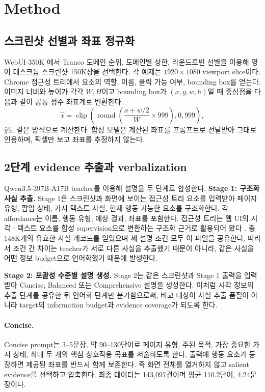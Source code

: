 \section{Method}

\subsection{스크린샷 선별과 좌표 정규화}

WebUI-350K \citep{biglab2024webui350k}에서 Tranco 도메인 순위,
도메인별 상한, 라운드로빈 선별을 이용해 영어 데스크톱 스크린샷
150K장을 선택한다. 각
예제는 $1920\times1080$ viewport slice이다. Chrome 접근성 트리에서
요소의 역할, 이름, 클릭 가능 여부, bounding box를 얻는다. 이미지
너비와 높이가 각각 $W,H$이고 bounding box가 $(x,y,w,h)$일 때
중심점을 다음과 같이 공통 정수 좌표계로 변환한다.
\begin{equation}
\hat{x}=\operatorname{clip}\!\left(
\operatorname{round}\left(\frac{x+w/2}{W}\times999\right),0,999\right),
\end{equation}
$\hat{y}$도 같은 방식으로 계산한다. 합성 모델은 계산된 좌표를
프롬프트로 전달받아 그대로 인용하며, 픽셀만 보고 좌표를 추정하지
않는다.

\subsection{2단계 evidence 추출과 verbalization}

Qwen3.5-397B-A17B teacher를 이용해 설명을 두 단계로 합성한다.
\textbf{Stage 1: 구조화 사실 추출.} Stage 1은 스크린샷과 화면에
보이는 접근성 트리 요소를 입력받아
페이지 유형, 팝업 상태, 가시 텍스트 사실, 현재 행동 가능한 요소를
구조화한다. 각 affordance는 이름, 행동 유형, 예상 결과, 좌표를
포함한다. 접근성 트리는 웹 UI의 시각ㆍ텍스트 요소를 합성
supervision으로 변환하는 구조화 근거로 활용되어 왔다
\citep{liu2025multiui}. 총 148K개의 유효한 사실 레코드를 얻었으며
세 설명 조건 모두 이 파일을 공유한다. 따라서 조건 간 차이는 teacher가
서로 다른 사실을 추출했기 때문이 아니라, 같은 사실을 어떤
정보 budget으로 언어화했기 때문에 발생한다.

\textbf{Stage 2: 포괄성 수준별 설명 생성.} Stage 2는 같은
스크린샷과 Stage 1 출력을 입력받아 Concise, Balanced 또는
Comprehensive 설명을 생성한다. 이처럼
시각 정보의 추출 단계를 공유한 뒤 언어화 단계만 분기함으로써,
비교 대상이 사실 추출 품질이 아니라 target의 information
budget과 evidence coverage가 되도록 한다.

\paragraph{Concise.}
Concise prompt는 3--5문장, 약 90--130단어로 페이지 유형, 주된 목적,
가장 중요한 가시 상태, 최대 두 개의 핵심 상호작용 목표를
서술하도록 한다. 출력에 행동 요소가 등장하면 제공된 좌표를 반드시
함께 보존한다. 즉 화면 전체를 열거하지 않고 salient evidence를
선택하고 압축한다. 최종 데이터는 143,097건이며 평균
110.2단어, 4.24문장이다.

